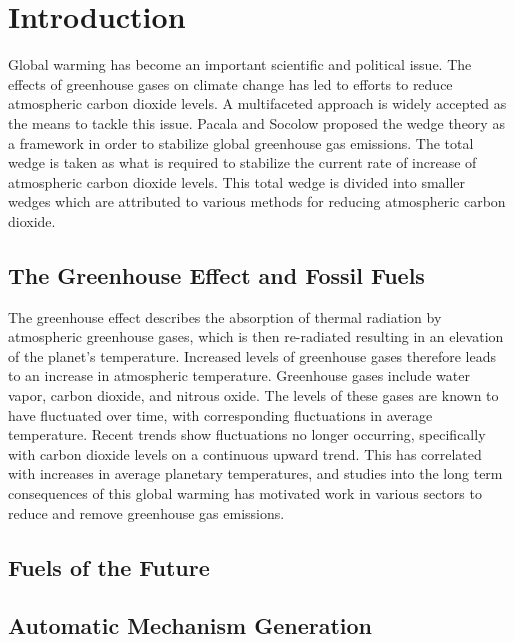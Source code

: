 \documentclass[12pt]{article}
\begin{document}
\title{}
\author{Pierre L. Bhoorasingh}
\date{\today}
\maketitle

\newpage
\tableofcontents

\newpage
\section{Introduction}

Global warming has become an important scientific and political issue. The effects of greenhouse gases on climate change has led to efforts to reduce atmospheric carbon dioxide levels. A multifaceted approach is widely accepted as the means to tackle this issue. Pacala and Socolow proposed the wedge theory as a framework in order to stabilize global greenhouse gas emissions. The total wedge is taken as what is required to stabilize the current rate of increase of atmospheric carbon dioxide levels. This total wedge is divided into smaller wedges which are attributed to various methods for reducing atmospheric carbon dioxide. 

\subsection{The Greenhouse Effect and Fossil Fuels}

The greenhouse effect describes the absorption of thermal radiation by atmospheric greenhouse gases, which is then re-radiated resulting in an elevation of the planet's temperature. Increased levels of greenhouse gases therefore leads to an increase in atmospheric temperature. Greenhouse gases include water vapor, carbon dioxide, and nitrous oxide. The levels of these gases are known to have fluctuated over time, with corresponding fluctuations in average temperature. Recent trends show fluctuations no longer occurring, specifically with carbon dioxide levels on a continuous upward trend. This has correlated with increases in average planetary temperatures, and studies into the long term consequences of this global warming has motivated work in various sectors to reduce and remove greenhouse gas emissions.

\subsection{Fuels of the Future}

\subsection{Automatic Mechanism Generation}
\end{document}
